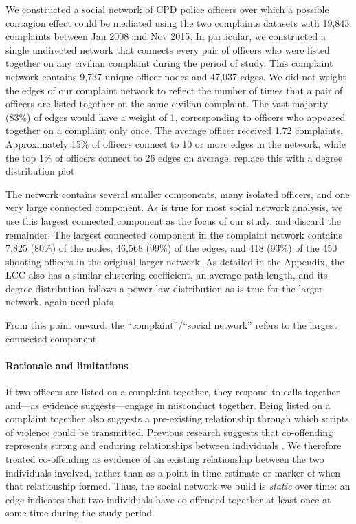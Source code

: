 We constructed a social network of CPD police officers over which a possible
contagion effect could be mediated
using the {\color{red} two complaints datasets with 19,843 complaints between Jan 2008 and Nov 2015}. 
In particular, we constructed a single undirected network that 
 connects every pair of officers who were listed together on any
 civilian complaint during the period of study. This complaint network
contains 9,737 unique officer nodes and 47,037 edges. We did not
weight the edges of our complaint network to reflect the number of times that a
pair of officers are listed together on the same civilian complaint. The vast
majority (83\%) of edges would have a weight of 1, corresponding to officers who 
appeared together on a complaint only once. The average officer received 1.72 complaints. 
Approximately 15\% of officers connect to 10 or more edges in the network, while the top
1\% of officers connect to 26 edges on average. {\color{red} replace this with a degree distribution plot}

The network contains several smaller components, many isolated
officers, and one very large connected component. As is true for most social network analysis, we use this
largest connected component as the focus of our study, and discard the remainder. 
The largest connected component in the complaint network contains 7,825 (80\%) of the
nodes, 46,568 (99\%) of the edges, and 418 (93\%) of the 450 shooting officers in %
the original larger network. 
As detailed in the Appendix, the LCC also has a similar
clustering coefficient, an average path length, and its degree distribution
follows a power-law distribution as is true for the larger network. 
{\color{red} again need plots}

From this point onward, the ``complaint''/``social network''  refers to the largest connected component.

\paragraph{Rationale and limitations}
If two officers are listed on a complaint together, they respond
to calls together and---as evidence suggests---engage in misconduct
together. Being listed on a complaint together also suggests a pre-existing
relationship through which scripts of violence could be transmitted.
Previous research suggests that
co-offending represents strong and enduring relationships between individuals \cite{Xx}.
We therefore treated co-offending as evidence of an existing relationship
between the two individuals involved, rather than as a point-in-time estimate
or marker of when that relationship formed. Thus, the social network we build
is \emph{static} over time: an edge indicates that two individuals have co-offended together
at least once at some time during the study period.

